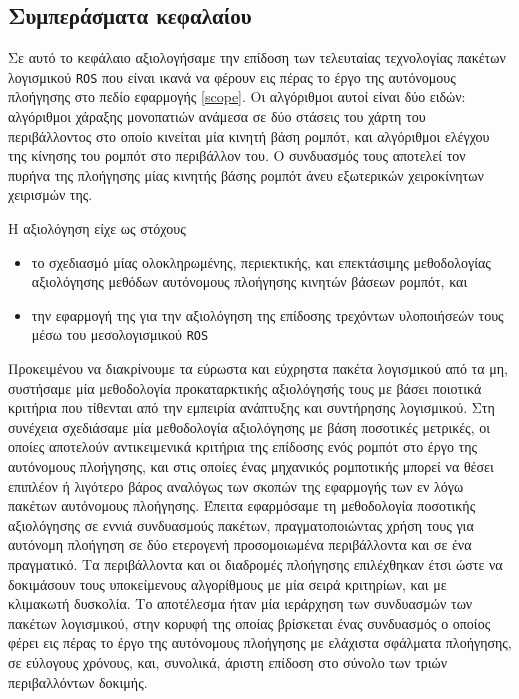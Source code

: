 \subsection{Συμπεράσματα κεφαλαίου}
\label{subsection:02_01_05:01}

Σε αυτό το κεφάλαιο αξιολογήσαμε την επίδοση των τελευταίας τεχνολογίας πακέτων
λογισμικού \texttt{ROS} που είναι ικανά να φέρουν εις πέρας το έργο της
αυτόνομους πλοήγησης στο πεδίο εφαρμογής \ref{scope}. Οι αλγόριθμοι αυτοί είναι
δύο ειδών: αλγόριθμοι χάραξης μονοπατιών ανάμεσα σε δύο στάσεις του χάρτη του
περιβάλλοντος στο οποίο κινείται μία κινητή βάση ρομπότ, και αλγόριθμοι ελέγχου
της κίνησης του ρομπότ στο περιβάλλον του. Ο συνδυασμός τους αποτελεί τον
πυρήνα της πλοήγησης μίας κινητής βάσης ρομπότ άνευ εξωτερικών χειροκίνητων
χειρισμών της.

Η αξιολόγηση είχε ως στόχους
\begin{itemize}
  \item το σχεδιασμό μίας ολοκληρωμένης, περιεκτικής, και επεκτάσιμης
        μεθοδολογίας αξιολόγησης μεθόδων αυτόνομους πλοήγησης κινητών βάσεων
        ρομπότ, και
  \item την εφαρμογή της για την αξιολόγηση της επίδοσης τρεχόντων υλοποιήσεών
        τους μέσω του μεσολογισμικού \texttt{ROS}
\end{itemize}

Προκειμένου να διακρίνουμε τα εύρωστα και εύχρηστα πακέτα λογισμικού από τα μη,
συστήσαμε μία μεθοδολογία προκαταρκτικής αξιολόγησής τους με βάσει ποιοτικά
κριτήρια που τίθενται από την εμπειρία ανάπτυξης και συντήρησης λογισμικού.
Στη συνέχεια σχεδιάσαμε μία μεθοδολογία αξιολόγησης με βάση ποσοτικές μετρικές,
οι οποίες αποτελούν αντικειμενικά κριτήρια της επίδοσης ενός ρομπότ στο έργο
της αυτόνομους πλοήγησης, και στις οποίες ένας μηχανικός ρομποτικής μπορεί να
θέσει επιπλέον ή λιγότερο βάρος αναλόγως των σκοπών της εφαρμογής των εν λόγω
πακέτων αυτόνομους πλοήγησης. Έπειτα εφαρμόσαμε τη μεθοδολογία ποσοτικής
αξιολόγησης σε εννιά συνδυασμούς πακέτων, πραγματοποιώντας χρήση τους για
αυτόνομη πλοήγηση σε δύο ετερογενή προσομοιωμένα περιβάλλοντα και σε ένα
πραγματικό. Τα περιβάλλοντα και οι διαδρομές πλοήγησης επιλέχθηκαν έτσι ώστε
να δοκιμάσουν τους υποκείμενους αλγορίθμους με μία σειρά κριτηρίων, και με
κλιμακωτή δυσκολία. Το αποτέλεσμα ήταν μία ιεράρχηση των συνδυασμών των πακέτων
λογισμικού, στην κορυφή της οποίας βρίσκεται ένας συνδυασμός ο οποίος φέρει
εις πέρας το έργο της αυτόνομους πλοήγησης με ελάχιστα σφάλματα πλοήγησης,
σε εύλογους χρόνους, και, συνολικά, άριστη επίδοση στο σύνολο των τριών
περιβαλλόντων δοκιμής.


